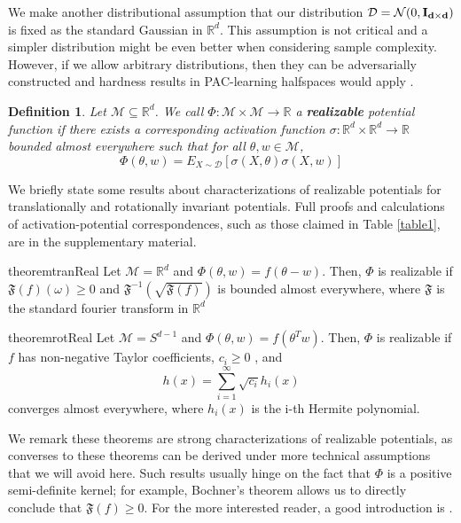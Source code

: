 \documentclass{article}
\newtheorem{definition}[theorem]{Definition}
\newcommand{\R}{{\mathbb{R}}}
\begin{document}
We make another distributional assumption that our distribution $\mathcal{D} = \mathcal{N}(0, {\bf I_{d\times d}})$ is fixed as the standard Gaussian in $\R^d$. This assumption is not critical and a simpler distribution might be even better when considering sample complexity. However, if we allow arbitrary distributions, then they can be adversarially constructed and hardness results in PAC-learning halfspaces would apply \cite{klivans2006cryptographic}. 

\begin{definition}
Let $\mathcal{M} \subseteq \R^d$. We call $\Phi: \mathcal{M} \times \mathcal{M} \to \R$ a {\bf realizable} potential function if there exists a corresponding activation function $\sigma:\R^d \times \R^d \to \R$ bounded almost everywhere such that for all $\theta, w \in \mathcal{M}$,
\[\Phi(\theta,w) = E_{X \sim \mathcal{D}}[\sigma(X,\theta)\sigma(X,w)]\]
\end{definition}

We briefly state some results about characterizations of realizable potentials for translationally and rotationally invariant potentials. Full proofs and calculations of activation-potential correspondences, such as those claimed in Table \ref{table1}, are in the supplementary material.
 
\begin{restatable}{theorem}{tranReal}
\label{thm:tranReal}
Let $\mathcal{M} = \R^d$ and $\Phi(\theta,w) = f(\theta - w)$. Then, $\Phi$ is realizable if $\mathfrak{F}(f)(\omega) \geq 0$ and $\mathfrak{F}^{-1}(\sqrt{\mathfrak{F}(f)})$ is bounded almost everywhere, where $\mathfrak{F}$ is the standard fourier transform in $\R^d$
\end{restatable}




\begin{restatable}{theorem}{rotReal}
\label{thm:rotReal}
Let $\mathcal{M} = S^{d-1}$ and $\Phi(\theta,w) = f(\theta^Tw)$. Then, $\Phi$ is realizable if $f$ has non-negative Taylor coefficients, $c_i \geq 0$ , and 
\[h(x) = \sum_{i=1}^\infty \sqrt{c_i} h_i(x)\]
converges almost everywhere, where $h_i(x)$ is the i-th Hermite polynomial.
\end{restatable}

We remark these theorems are strong characterizations of realizable potentials, as converses to these theorems can be derived under more technical assumptions that we will avoid here. Such results usually hinge on the fact that $\Phi$ is a positive semi-definite kernel; for example, Bochner's theorem allows us to directly conclude that $\mathfrak{F}(f) \geq 0$. For the more interested reader, a good introduction is \cite{Fasshauer_positivedefinite}. 
\end{document}
